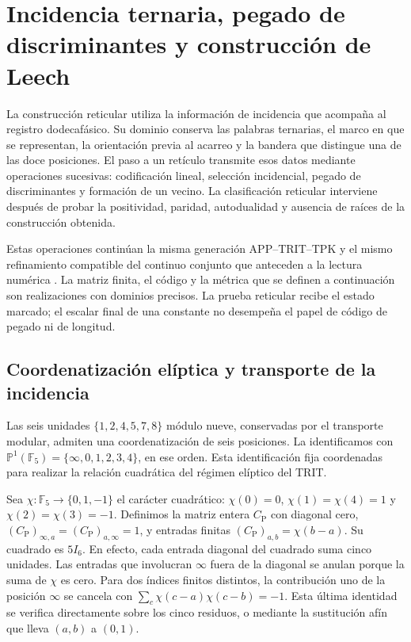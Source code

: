 \section{Incidencia ternaria, pegado de discriminantes y construcción de Leech}
\label{sec:lf-foundations}

La construcción reticular utiliza la información de incidencia que
acompaña al registro dodecafásico. Su dominio conserva las palabras
ternarias, el marco en que se representan, la orientación previa al
acarreo y la bandera que distingue una de las doce posiciones. El
paso a un retículo transmite esos datos mediante operaciones
sucesivas: codificación lineal, selección incidencial, pegado de
discriminantes y formación de un vecino. La clasificación reticular
interviene después de probar la positividad, paridad, autodualidad
y ausencia de raíces de la construcción obtenida.

Estas operaciones continúan la misma generación
APP--TRIT--TPK y el mismo refinamiento compatible del continuo
conjunto que anteceden a la lectura numérica \cite{HMT-IV}.
La matriz finita, el código y la métrica que se definen a
continuación son realizaciones con dominios precisos. La prueba
reticular recibe el estado marcado; el escalar final de una
constante no desempeña el papel de código de pegado ni de longitud.

\subsection{Coordenatización elíptica y transporte de la incidencia}
\label{subsec:lf-incidence}

Las seis unidades \(\{1,2,4,5,7,8\}\) módulo nueve, conservadas
por el transporte modular, admiten una coordenatización de seis posiciones.
La identificamos con
\(\mathbb P^1(\mathbb F_5)=\{\infty,0,1,2,3,4\}\), en ese orden.
Esta identificación fija coordenadas para realizar la relación
cuadrática del régimen elíptico del TRIT.

Sea \(\chi:\mathbb F_5\to\{0,1,-1\}\) el carácter cuadrático:
\(\chi(0)=0\), \(\chi(1)=\chi(4)=1\) y
\(\chi(2)=\chi(3)=-1\). Definimos la matriz entera
\(C_{\mathrm P}\) con diagonal cero,
\((C_{\mathrm P})_{\infty,a}=(C_{\mathrm P})_{a,\infty}=1\),
y entradas finitas \((C_{\mathrm P})_{a,b}=\chi(b-a)\).
Su cuadrado es \(5I_6\). En efecto, cada entrada diagonal del
cuadrado suma cinco unidades. Las entradas que involucran
\(\infty\) fuera de la diagonal se anulan porque la suma de
\(\chi\) es cero. Para dos índices finitos distintos, la
contribución uno de la posición \(\infty\) se cancela con
\(\sum_c\chi(c-a)\chi(c-b)=-1\). Esta última identidad se verifica
directamente sobre los cinco residuos, o mediante la sustitución
afín que lleva \((a,b)\) a \((0,1)\).

